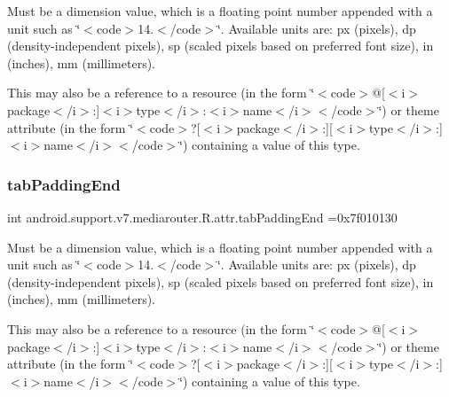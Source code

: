 Must be a dimension value, which is a floating point number appended with a unit such as \char`\"{}$<$code$>$14.\+5sp$<$/code$>$\char`\"{}. Available units are\+: px (pixels), dp (density-\/independent pixels), sp (scaled pixels based on preferred font size), in (inches), mm (millimeters). 

This may also be a reference to a resource (in the form \char`\"{}$<$code$>$@\mbox{[}$<$i$>$package$<$/i$>$\+:\mbox{]}$<$i$>$type$<$/i$>$\+:$<$i$>$name$<$/i$>$$<$/code$>$\char`\"{}) or theme attribute (in the form \char`\"{}$<$code$>$?\mbox{[}$<$i$>$package$<$/i$>$\+:\mbox{]}\mbox{[}$<$i$>$type$<$/i$>$\+:\mbox{]}$<$i$>$name$<$/i$>$$<$/code$>$\char`\"{}) containing a value of this type. \mbox{\label{classandroid_1_1support_1_1v7_1_1mediarouter_1_1R_1_1attr_af11cb22ecb52dbd2b662fba62abac03a}} 
\subsubsection{\texorpdfstring{tab\+Padding\+End}{tabPaddingEnd}}
{\footnotesize\ttfamily int android.\+support.\+v7.\+mediarouter.\+R.\+attr.\+tab\+Padding\+End =0x7f010130\hspace{0.3cm}{\ttfamily [static]}}

Must be a dimension value, which is a floating point number appended with a unit such as \char`\"{}$<$code$>$14.\+5sp$<$/code$>$\char`\"{}. Available units are\+: px (pixels), dp (density-\/independent pixels), sp (scaled pixels based on preferred font size), in (inches), mm (millimeters). 

This may also be a reference to a resource (in the form \char`\"{}$<$code$>$@\mbox{[}$<$i$>$package$<$/i$>$\+:\mbox{]}$<$i$>$type$<$/i$>$\+:$<$i$>$name$<$/i$>$$<$/code$>$\char`\"{}) or theme attribute (in the form \char`\"{}$<$code$>$?\mbox{[}$<$i$>$package$<$/i$>$\+:\mbox{]}\mbox{[}$<$i$>$type$<$/i$>$\+:\mbox{]}$<$i$>$name$<$/i$>$$<$/code$>$\char`\"{}) containing a value of this type. \mbox{\label{classandroid_1_1support_1_1v7_1_1mediarouter_1_1R_1_1attr_a46e385e70f6d519145f8f6c01da91116}} 
